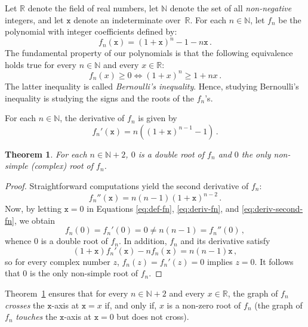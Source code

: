 \documentclass[12pt]{article}
\newcommand{\bR}{\mathbb{R}}
\newcommand{\bN}{\mathbb{N}}
\newcommand{\ttx}{\mathtt{x}}
\newtheorem{theorem}{Theorem}
\begin{document}
\sloppy

Let $\bR$ denote the field of real numbers,
let $\bN$ denote the set of all \emph{non-negative} integers, and 
let $\ttx$ denote an indeterminate over~$\bR$.
For each $n \in \bN$, let $f_n$ be the polynomial with integer coefficients defined by:
\begin{equation} \label{eq:def-fn}
f_n(\ttx) = {(1 + \ttx)}^n - 1 - n \ttx  \,.
\end{equation}
The fundamental property of our polynomials is
that the following equivalence holds true for every $n \in \bN$ and every $x \in \bR$:
$$
f_n(x) \ge 0 \iff {(1 + x)}^n \ge 1 + n x \,.
$$ 
The latter inequality is called \emph{Bernoulli's inequality}.
Hence, studying Bernoulli's inequality is studying the signs and the roots of the $f_n$'s.

For each $n \in \bN$, the derivative of $f_n$ is  given by
\begin{equation} \label{eq:deriv-fn} 
  f_n'(\ttx)  = n \left( {(1 + \ttx)}^{n - 1} -  1 \right) \, .
\end{equation}

\begin{theorem} \label{thm:root-mult}
  For each $n \in \bN + 2$,
  $0$ is a double root of $f_n$ and $0$ the only non-simple (complex) root of $f_n$.
\end{theorem}

\begin{proof}
  Straightforward computations yield the second derivative of $f_n$:
\begin{equation} \label{eq:deriv-second-fn}
f_n''(\ttx)  = n (n - 1) {(1 + \ttx)}^{n - 2} \, .
\end{equation}
  Now, by letting $\ttx = 0$ in Equations \eqref{eq:def-fn}, \eqref{eq:deriv-fn}, and \eqref{eq:deriv-second-fn},
  we obtain 
  $$
  f_n(0) = f_n'(0) = 0 \ne n (n - 1) = f_n''(0) \, ,
  $$
  whence $0$ is a double root of $f_n$.
  In addition, $f_n$ and its derivative satisfy 
   $$
   (1 + \ttx) f_n'(\ttx) - n f_n(\ttx) = n (n - 1) \ttx \, ,
   $$
   so for every complex number $z$, $f_n(z) = f_n'(z) = 0$ implies $z = 0$.
   It follows that $0$ is the only non-simple root of $f_n$.
 \end{proof}
 
 Theorem~\ref{thm:root-mult} ensures that
for every $n \in \bN + 2$ and every $x \in \bR$, 
the graph of $f_n$ \emph{crosses} the $\ttx$-axis at $\ttx = x$ if, and only if, $x$ is a non-zero root of $f_n$
(the graph of $f_n$ \emph{touches} the $\ttx$-axis at $\ttx = 0$ but does not cross).
\end{document}
